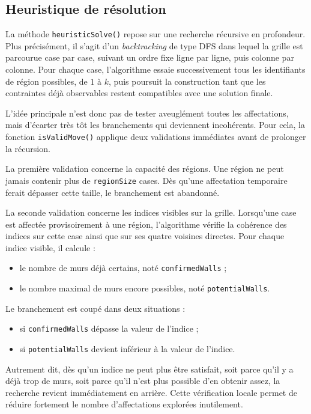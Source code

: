 \subsection{Heuristique de résolution}

La méthode \texttt{heuristicSolve()} repose sur une recherche récursive en profondeur. Plus précisément, il s'agit d'un \textit{backtracking} de type DFS dans lequel la grille est parcourue case par case, suivant un ordre fixe ligne par ligne, puis colonne par colonne. Pour chaque case, l'algorithme essaie successivement tous les identifiants de région possibles, de \(1\) à \(k\), puis poursuit la construction tant que les contraintes déjà observables restent compatibles avec une solution finale.

L'idée principale n'est donc pas de tester aveuglément toutes les affectations, mais d'écarter très tôt les branchements qui deviennent incohérents. Pour cela, la fonction \texttt{isValidMove()} applique deux validations immédiates avant de prolonger la récursion.

La première validation concerne la capacité des régions. Une région ne peut jamais contenir plus de \texttt{regionSize} cases. Dès qu'une affectation temporaire ferait dépasser cette taille, le branchement est abandonné.

La seconde validation concerne les indices visibles sur la grille. Lorsqu'une case est affectée provisoirement à une région, l'algorithme vérifie la cohérence des indices sur cette case ainsi que sur ses quatre voisines directes. Pour chaque indice visible, il calcule :
\begin{itemize}
    \item le nombre de murs déjà certains, noté \texttt{confirmedWalls} ;
    \item le nombre maximal de murs encore possibles, noté \texttt{potentialWalls}.
\end{itemize}

Le branchement est coupé dans deux situations :
\begin{itemize}
    \item si \texttt{confirmedWalls} dépasse la valeur de l'indice ;
    \item si \texttt{potentialWalls} devient inférieur à la valeur de l'indice.
\end{itemize}

Autrement dit, dès qu'un indice ne peut plus être satisfait, soit parce qu'il y a déjà trop de murs, soit parce qu'il n'est plus possible d'en obtenir assez, la recherche revient immédiatement en arrière. Cette vérification locale permet de réduire fortement le nombre d'affectations explorées inutilement.

